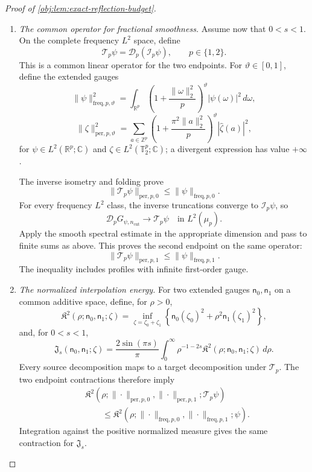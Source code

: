 \documentclass[11pt]{article}
\begin{document}
\begin{proof}[Proof of \cref{obj:lem:exact-reflection-budget}]
\begin{enumerate}
\item \textit{The common operator for fractional smoothness.}
Assume now that \(0<s<1\). On the complete frequency \(L^2\) space, define
\[
\mathscr T_p\psi=\mathscr D_p(\mathcal I_p\psi),
\qquad p\in\{1,2\}.
\]
This is a common linear operator for the two endpoints. For \(\vartheta\in[0,1]\), define the extended gauges
\[
\|\psi\|_{\mathrm{freq},p,\vartheta}^2
=
\int_{\mathbb R^p}
\left(1+\frac{\|\omega\|_2^2}{p}\right)^\vartheta
|\psi(\omega)|^2\,d\omega,
\]
\[
\|\zeta\|_{\mathrm{per},p,\vartheta}^2
=
\sum_{a\in\mathbb Z^p}
\left(1+\frac{\pi^2\|a\|_2^2}{p}\right)^\vartheta
|\widehat\zeta(a)|^2,
\]
for \(\psi\in L^2(\mathbb R^p;\mathbb C)\) and
\(\zeta\in L^2(\mathbb T_2^p;\mathbb C)\); a divergent expression has value \(+\infty\).

The inverse isometry and folding prove
\[
\|\mathscr T_p\psi\|_{\mathrm{per},p,0}
\leq
\|\psi\|_{\mathrm{freq},p,0}.
\]
For every frequency \(L^2\) class, the inverse truncations converge to
\(\mathcal I_p\psi\), so
\[
\mathscr D_pG_{\psi,n_{\mathrm{cut}}}
\longrightarrow\mathscr T_p\psi
\quad\text{in }L^2(\mu_p).
\]
Apply the smooth spectral estimate in the appropriate dimension and pass to finite sums as above. This proves the second endpoint on the same operator:
\[
\|\mathscr T_p\psi\|_{\mathrm{per},p,1}
\leq
\|\psi\|_{\mathrm{freq},p,1}.
\]
The inequality includes profiles with infinite first-order gauge.

\item \textit{The normalized interpolation energy.}
For two extended gauges \(\mathsf n_0,\mathsf n_1\) on a common additive space, define, for \(\rho>0\),
\[
\mathfrak K^2(\rho;\mathsf n_0,\mathsf n_1;\zeta)
=
\inf_{\zeta=\zeta_0+\zeta_1}
\left\{
\mathsf n_0(\zeta_0)^2+
\rho^2\mathsf n_1(\zeta_1)^2
\right\},
\]
and, for \(0<s<1\),
\[
\mathfrak J_s(\mathsf n_0,\mathsf n_1;\zeta)
=
\frac{2\sin(\pi s)}{\pi}
\int_0^\infty
\rho^{-1-2s}
\mathfrak K^2(\rho;\mathsf n_0,\mathsf n_1;\zeta)\,d\rho.
\]
Every source decomposition maps to a target decomposition under \(\mathscr T_p\). The two endpoint contractions therefore imply
\[
\begin{aligned}
&\mathfrak K^2\!\left(
\rho;
\|\cdot\|_{\mathrm{per},p,0},
\|\cdot\|_{\mathrm{per},p,1};
\mathscr T_p\psi
\right)\\
&\qquad\leq
\mathfrak K^2\!\left(
\rho;
\|\cdot\|_{\mathrm{freq},p,0},
\|\cdot\|_{\mathrm{freq},p,1};
\psi
\right).
\end{aligned}
\]
Integration against the positive normalized measure gives the same contraction for \(\mathfrak J_s\).


\end{enumerate}
\end{proof}
\end{document}
